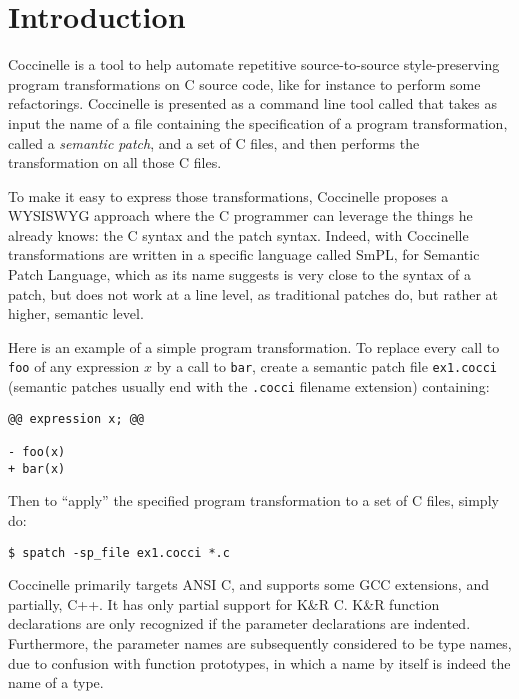 \chapter{Introduction}

Coccinelle is a tool to help automate repetitive
source-to-source style-preserving program transformations
on C source code, like for instance to perform some refactorings.
Coccinelle is presented as a command line tool called \spatch that takes
as input the name of a file containing the specification of a program
transformation, called a {\em semantic patch}, and a set of C files,
and then performs the transformation on all those C files.

To make it easy to express those transformations,
Coccinelle proposes a WYSISWYG approach where the C programmer
can leverage the things he already knows: the C syntax
and the patch syntax. Indeed, with Coccinelle transformations
are written in a specific language called SmPL, for
Semantic Patch Language, which as its name suggests is very
close to the syntax of a patch, but does not
work at a line level, as traditional patches do,
but rather at higher, semantic level.

Here is an example of a simple program transformation.
To replace every call to \verb+foo+ of any expression $x$
by a call to \verb+bar+, create a semantic patch file \verb+ex1.cocci+
(semantic patches usually end with the \verb+.cocci+  filename extension)
containing:
\begin{verbatim}
@@ expression x; @@

- foo(x)
+ bar(x)

\end{verbatim}

Then to ``apply'' the specified program transformation to a set of C files,
simply do:
\begin{verbatim}
$ spatch -sp_file ex1.cocci *.c
\end{verbatim}


Coccinelle primarily targets ANSI C, and supports some GCC extensions, and partially, C++.  It
has only partial support for K\&R C.  K\&R function declarations are only
recognized if the parameter declarations are indented.  Furthermore, the
parameter names are subsequently considered to be type names, due to
confusion with function prototypes, in which a name by itself is indeed the
name of a type.








